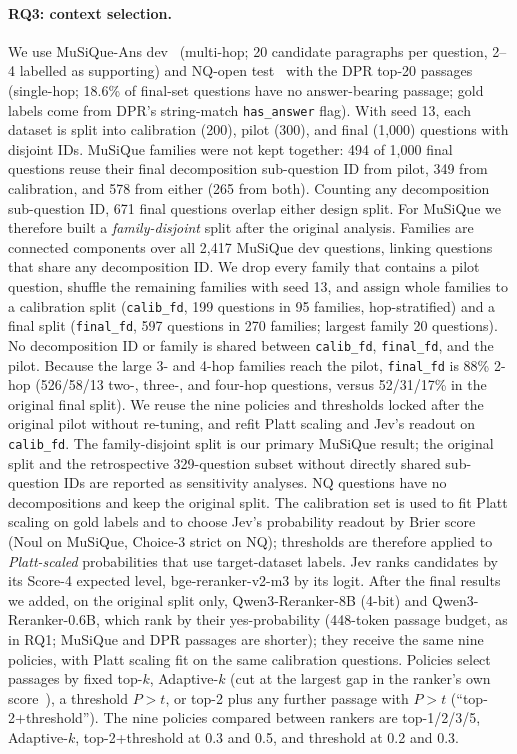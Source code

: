 \paragraph{RQ3: context selection.}
We use MuSiQue-Ans dev~\cite{trivedi2022musique} (multi-hop; 20 candidate paragraphs per question, 2--4 labelled as supporting) and NQ-open test~\cite{kwiatkowski2019nq} with the DPR top-20 passages~\cite{karpukhin2020dpr} (single-hop; 18.6\% of final-set questions have no answer-bearing passage; gold labels come from DPR's string-match \texttt{has\_answer} flag).
With seed 13, each dataset is split into calibration (200), pilot (300), and final (1,000) questions with disjoint IDs. MuSiQue families were not kept together: 494 of 1,000 final questions reuse their final decomposition sub-question ID from pilot, 349 from calibration, and 578 from either (265 from both). Counting any decomposition sub-question ID, 671 final questions overlap either design split.
For MuSiQue we therefore built a \emph{family-disjoint} split after the original analysis. Families are connected components over all 2{,}417 MuSiQue dev questions, linking questions that share any decomposition ID. We drop every family that contains a pilot question, shuffle the remaining families with seed 13, and assign whole families to a calibration split (\texttt{calib\_fd}, 199 questions in 95 families, hop-stratified) and a final split (\texttt{final\_fd}, 597 questions in 270 families; largest family 20 questions). No decomposition ID or family is shared between \texttt{calib\_fd}, \texttt{final\_fd}, and the pilot. Because the large 3- and 4-hop families reach the pilot, \texttt{final\_fd} is 88\% 2-hop (526/58/13 two-, three-, and four-hop questions, versus 52/31/17\% in the original final split). We reuse the nine policies and thresholds locked after the original pilot without re-tuning, and refit Platt scaling and Jev's readout on \texttt{calib\_fd}. The family-disjoint split is our primary MuSiQue result; the original split and the retrospective 329-question subset without directly shared sub-question IDs are reported as sensitivity analyses. NQ questions have no decompositions and keep the original split.
The calibration set is used to fit Platt scaling on gold labels and to choose Jev's probability readout by Brier score (Noul on MuSiQue, Choice-3 strict on NQ); thresholds are therefore applied to \emph{Platt-scaled} probabilities that use target-dataset labels.
Jev ranks candidates by its Score-4 expected level, bge-reranker-v2-m3 by its logit. After the final results we added, on the original split only, Qwen3-Reranker-8B (4-bit) and Qwen3-Reranker-0.6B, which rank by their yes-probability (448-token passage budget, as in RQ1; MuSiQue and DPR passages are shorter); they receive the same nine policies, with Platt scaling fit on the same calibration questions. Policies select passages by fixed top-$k$, Adaptive-$k$ (cut at the largest gap in the ranker's own score~\cite{adaptivek2025}), a threshold $P>t$, or top-2 plus any further passage with $P>t$ (``top-2+threshold''). The nine policies compared between rankers are top-1/2/3/5, Adaptive-$k$, top-2+threshold at 0.3 and 0.5, and threshold at 0.2 and 0.3.
